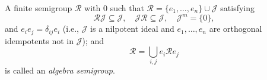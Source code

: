 A finite semigroup $\mathcal{R}$ with $0$ such that $\mathcal{R} = \{e_1, \ldots, e_n\} \cup \mathcal{J}$ satisfying
$$\mathcal{R}\mathcal{J} \subseteq \mathcal{J},\quad \mathcal{J}\mathcal{R} \subseteq \mathcal{J},\quad \mathcal{J}^m = \{0\},$$
and $e_i e_j = \delta_{ij} e_i$ (i.e., $\mathcal{J}$ is a nilpotent ideal and $e_1, \ldots, e_n$ are orthogonal idempotents not in $\mathcal{J}$); and
$$\mathcal{R} = \bigcup_{i,j} e_i \mathcal{R} e_j$$
is called an \textit{algebra semigroup}.
